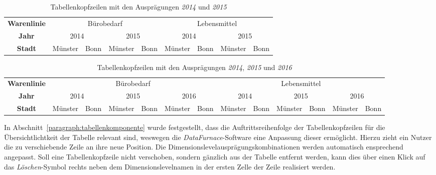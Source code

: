\documentclass[
  language=german, %
  type=bachelor,%
  ngerman
]{isthesis}
\begin{document}
\begin{content}
    \begin{table}[]
      \scriptsize
      \begin{tabular}{c c c c c c c c c}
        \textbf{Warenlinie} & \multicolumn{4}{c}{Bürobedarf} & \multicolumn{4}{c}{Lebensmittel} \\
            \cmidrule(lr){2-5}\cmidrule(lr){6-9}
        \textbf{Jahr} & \multicolumn{2}{c}{2014} & \multicolumn{2}{c}{2015} & \multicolumn{2}{c}{2014} & \multicolumn{2}{c}{2015}\\
            \cmidrule(lr){2-3}\cmidrule(lr){4-5}\cmidrule(lr){6-7}\cmidrule(lr){8-9}
        \textbf{Stadt} & Münster & Bonn & Münster & Bonn & Münster & Bonn & Münster & Bonn \\
      \end{tabular}
      \caption{Tabellenkopfzeilen mit den Ausprägungen \textit{2014} und \textit{2015}}\label{table:berichtstabellenkopf20142015}
    \end{table}

    \begin{table}
      \scriptsize
      \begin{tabular}{c c c c c c c c c c c c c}
        \textbf{Warenlinie} & \multicolumn{6}{c}{Bürobedarf} & \multicolumn{6}{c}{Lebensmittel} \\
            \cmidrule(lr){2-7}\cmidrule(lr){8-13}
        \textbf{Jahr} & \multicolumn{2}{c}{2014} & \multicolumn{2}{c}{2015} & \multicolumn{2}{c}{2016} & \multicolumn{2}{c}{2014} & \multicolumn{2}{c}{2015} & \multicolumn{2}{c}{2016}\\
            \cmidrule(lr){2-3}\cmidrule(lr){4-5}\cmidrule(lr){6-7}\cmidrule(lr){8-9}\cmidrule(lr){10-11}\cmidrule(lr){12-13}
        \textbf{Stadt} & Münster & Bonn & Münster & Bonn & Münster & Bonn & Münster & Bonn & Münster & Bonn & Münster & Bonn \\
      \end{tabular}
      \caption{Tabellenkopfzeilen mit den Ausprägungen \textit{2014}, \textit{2015} und \textit{2016}}\label{table:berichtstabellenkopf201420152016}
    \end{table}

  In Abschnitt~\ref{paragraph:tabellenkomponente} wurde festgestellt, dass die
  Auftrittsreihenfolge der Tabellenkopfzeilen für die Übersichtlichtkeit der
  Tabelle relevant sind, weswegen die \textit{DataFurnace}-Software eine Anpassung
  dieser ermöglicht. Hierzu zieht ein Nutzer die zu
  verschiebende Zeile an ihre neue Position. Die
  Dimensionslevelausprägungskombinationen werden automatisch ensprechend
  angepasst. Soll eine Tabellenkopfzeile nicht verschoben, sondern gänzlich aus
  der Tabelle entfernt werden, kann dies über einen Klick auf das
  \textit{Löschen}-Symbol rechts neben dem Dimensionslevelnamen in der ersten
  Zelle der Zeile realisiert werden.


\end{content}
\end{document}
